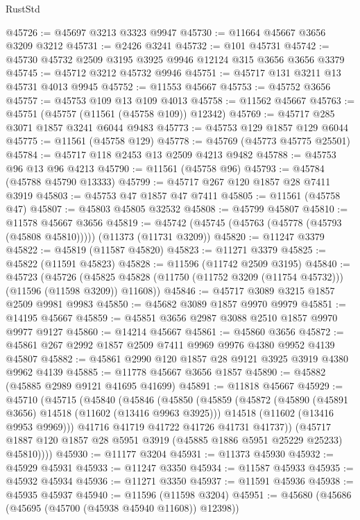 \begin{lexlean}{RustStd}
\begin{coremodule}
@45726 := @45697 @3213 @3323 @9947
@45730 := @11664 @45667 @3656 @3209 @3212
@45731 := @2426 @3241
@45732 := @101 @45731
@45742 := @45730 @45732 @2509 @3195 @3925 @9946 @12124 @315 @3656 @3656 @3379
@45745 := @45712 @3212 @45732 @9946
@45751 := @45717 @131 @3211 @13 @45731 @4013 @9945
@45752 := @11553 @45667
@45753 := @45752 @3656
@45757 := @45753 @109 @13 @109 @4013
@45758 := @11562 @45667
@45763 := @45751 (@45757 (@11561 (@45758 @109)) @12342)
@45769 := @45717 @285 @3071 @1857 @3241 @6044 @9483
@45773 := @45753 @129 @1857 @129 @6044
@45775 := @11561 (@45758 @129)
@45778 := @45769 (@45773 @45775 @25501)
@45784 := @45717 @118 @2453 @13 @2509 @4213 @9482
@45788 := @45753 @96 @13 @96 @4213
@45790 := @11561 (@45758 @96)
@45793 := @45784 (@45788 @45790 @13333)
@45799 := @45717 @267 @120 @1857 @28 @7411 @3919
@45803 := @45753 @47 @1857 @47 @7411
@45805 := @11561 (@45758 @47)
@45807 := @45803 @45805 @32532
@45808 := @45799 @45807
@45810 := @11578 @45667 @3656
@45819 := @45742 (@45745 (@45763 (@45778 (@45793 (@45808 @45810))))) (@11373 (@11731 @3209))
@45820 := @11247 @3379
@45822 := @45819 (@11587 @45820)
@45823 := @11271 @3379
@45825 := @45822 (@11591 @45823)
@45828 := @11596 (@11742 @2509 @3195)
@45840 := @45723
    (@45726 (@45825 @45828 (@11750 (@11752 @3209 (@11754 @45732))) (@11596 (@11598 @3209)) @11608))
@45846 := @45717 @3089 @3215 @1857 @2509 @9981 @9983
@45850 := @45682 @3089 @1857 @9970 @9979
@45851 := @14195 @45667
@45859 := @45851 @3656 @2987 @3088 @2510 @1857 @9970 @9977 @9127
@45860 := @14214 @45667
@45861 := @45860 @3656
@45872 := @45861 @267 @2992 @1857 @2509 @7411 @9969 @9976 @4380 @9952 @4139 @45807
@45882 := @45861 @2990 @120 @1857 @28 @9121 @3925 @3919 @4380 @9962 @4139
@45885 := @11778 @45667 @3656 @1857
@45890 := @45882 (@45885 @2989 @9121 @41695 @41699)
@45891 := @11818 @45667
@45929 := @45710
    (@45715
      (@45840
        (@45846
          (@45850
            (@45859
              (@45872
                (@45890 (@45891 @3656) @14518 (@11602 (@13416 @9963 @3925)))
                @14518
                (@11602 (@13416 @9953 @9969)))
              @41716
              @41719
              @41722
              @41726
              @41731
              @41737))
          (@45717 @1887 @120 @1857 @28 @5951 @3919 (@45885 @1886 @5951 @25229 @25233) @45810))))
@45930 := @11177 @3204
@45931 := @11373 @45930
@45932 := @45929 @45931
@45933 := @11247 @3350
@45934 := @11587 @45933
@45935 := @45932 @45934
@45936 := @11271 @3350
@45937 := @11591 @45936
@45938 := @45935 @45937
@45940 := @11596 (@11598 @3204)
@45951 := @45680
    (@45686 (@45695 (@45700 (@45938 @45940 @11608)) @12398))

\end{coremodule}
\end{lexlean}

